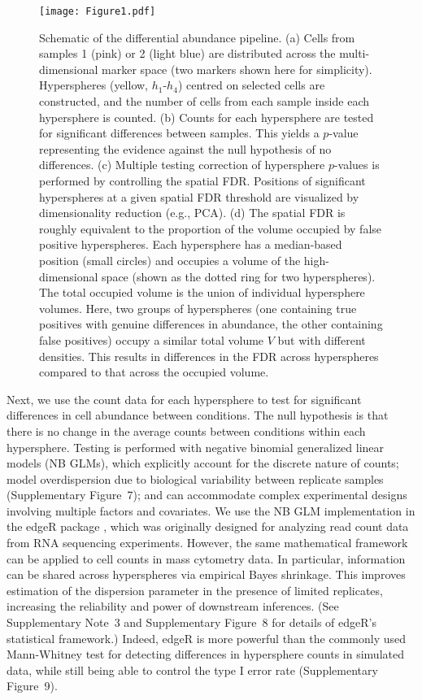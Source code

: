 \documentclass{article}
\newcommand{\suppsecedgeR}{3}
\newcommand{\suppfignbdisp}{7}
\newcommand{\suppfigfilter}{8}
\newcommand{\suppfigedgeR}{9}
\begin{document}
\begin{figure}[btp]
    \begin{center}
        \texttt{[image: Figure1.pdf]}
    \end{center}
    \caption{Schematic of the differential abundance pipeline.
        (a) Cells from samples 1 (pink) or 2 (light blue) are distributed across the multi-dimensional marker space (two markers shown here for simplicity).
        Hyperspheres (yellow, $h_1$-$h_4$) centred on selected cells are constructed, and the number of cells from each sample inside each hypersphere is counted.
        (b) Counts for each hypersphere are tested for significant differences between samples.
        This yields a $p$-value representing the evidence against the null hypothesis of no differences.
        (c) Multiple testing correction of hypersphere $p$-values is performed by controlling the spatial FDR.
        Positions of significant hyperspheres at a given spatial FDR threshold are visualized by dimensionality reduction (e.g., PCA).
        (d) The spatial FDR is roughly equivalent to the proportion of the volume occupied by false positive hyperspheres.
    Each hypersphere has a median-based position (small circles) and occupies a volume of the high-dimensional space (shown as the dotted ring for two hyperspheres).
    The total occupied volume is the union of individual hypersphere volumes.
    Here, two groups of hyperspheres (one containing true positives with genuine differences in abundance, the other containing false positives) occupy a similar total volume $V$ but with different densities.
This results in differences in the FDR across hyperspheres compared to that across the occupied volume.
    }
    \label{fig:overview}
\end{figure}

Next, we use the count data for each hypersphere to test for significant differences in cell abundance between conditions.
The null hypothesis is that there is no change in the average counts between conditions within each hypersphere.
Testing is performed with negative binomial generalized linear models (NB GLMs), which explicitly account for the discrete nature of counts; model overdispersion due to biological variability between replicate samples (Supplementary Figure~\suppfignbdisp{}); and can accommodate complex experimental designs involving multiple factors and covariates.
We use the NB GLM implementation in the edgeR package \cite{mccarthy2012differential}, which was originally designed for analyzing read count data from RNA sequencing experiments.
However, the same mathematical framework can be applied to cell counts in mass cytometry data.
In particular, information can be shared across hyperspheres via empirical Bayes shrinkage.
This improves estimation of the dispersion parameter in the presence of limited replicates, increasing the reliability and power of downstream inferences.
(See Supplementary Note~\suppsecedgeR{} and Supplementary Figure~\suppfigfilter{} for details of edgeR's statistical framework.)
Indeed, edgeR is more powerful than the commonly used Mann-Whitney test for detecting differences in hypersphere counts in simulated data, while still being able to control the type I error rate (Supplementary Figure~\suppfigedgeR).
\end{document}
